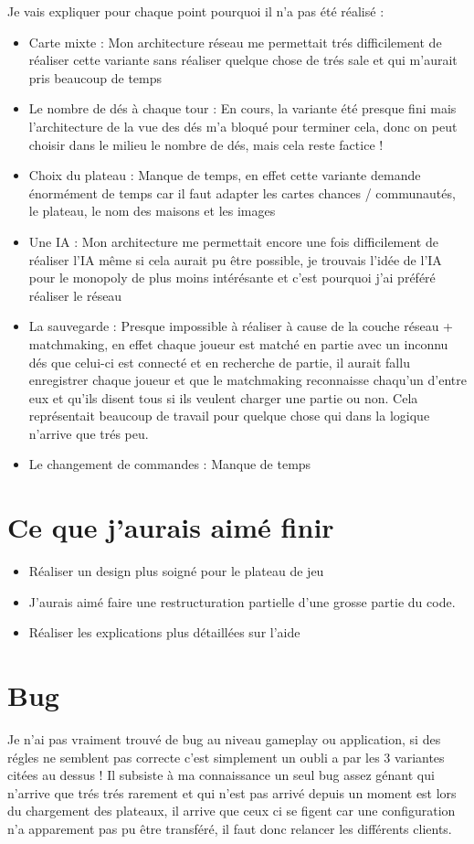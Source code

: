 \documentclass[12pt, openany]{report}
\begin{document}
Je vais expliquer pour chaque point pourquoi il n'a pas été réalisé :
      \begin{itemize}
        \item Carte mixte : Mon architecture réseau me permettait trés difficilement de réaliser cette variante sans réaliser quelque chose de trés sale et qui m'aurait pris beaucoup de temps
        \item Le nombre de dés à chaque tour : En cours, la variante été presque fini mais l'architecture de la vue des dés m'a bloqué pour terminer cela, donc on peut choisir dans le milieu le nombre de dés, mais cela reste factice !
	\item Choix du plateau : Manque de temps, en effet cette variante demande énormément de temps car il faut adapter les cartes chances / communautés, le plateau, le nom des maisons et les images
	\item Une IA : Mon architecture me permettait encore une fois difficilement de réaliser l'IA même si cela aurait pu être possible, je trouvais l'idée de l'IA pour le monopoly de plus moins intérésante et c'est pourquoi j'ai préféré réaliser le réseau
	\item La sauvegarde : Presque impossible à réaliser à cause de la couche réseau + matchmaking, en effet chaque joueur est matché en partie avec un inconnu dés que celui-ci est connecté et en recherche de partie, il aurait fallu enregistrer chaque joueur et que le matchmaking reconnaisse chaqu'un d'entre eux et qu'ils disent tous si ils veulent charger une partie ou non. Cela représentait beaucoup de travail pour quelque chose qui dans la logique n'arrive que trés peu.
	\item Le changement de commandes : Manque de temps
      \end{itemize}

    \section{Ce que j'aurais aimé finir}
      \begin{itemize}
        \item Réaliser un design plus soigné pour le plateau de jeu
        \item J'aurais aimé faire une restructuration partielle d'une grosse partie du code.
        \item Réaliser les explications plus détaillées sur l'aide
      \end{itemize}

    \section{Bug}
Je n'ai pas vraiment trouvé de bug au niveau gameplay ou application, si des régles ne semblent pas correcte c'est simplement un oubli a par les 3 variantes citées au dessus ! Il subsiste à ma connaissance un seul bug assez génant qui n'arrive que trés trés rarement et qui n'est pas arrivé depuis un moment est lors du chargement des plateaux, il arrive que ceux ci se figent car une configuration n'a apparement pas pu être transféré, il faut donc relancer les différents clients.
\end{document}
